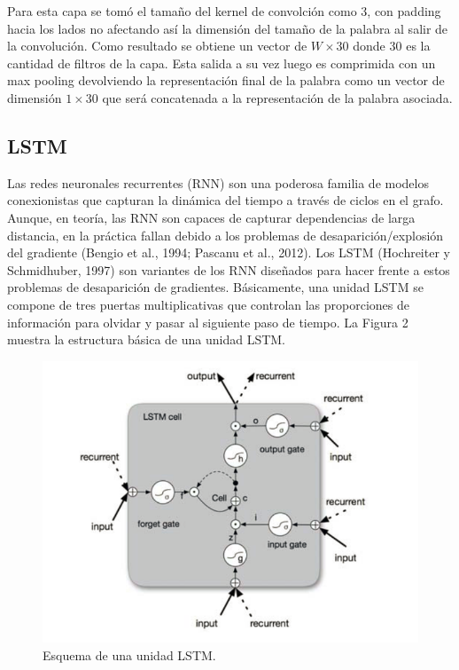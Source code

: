 \documentclass[runningheads]{llncs}
\begin{document}
\newpage

Para esta capa se tomó el tamaño del kernel de convolción como 3, con padding hacia los lados 
no afectando así la dimensión del tamaño de la palabra al salir de la convolución. Como resultado
se obtiene un vector de $W \times 30$ donde 30 es la cantidad de filtros de la capa. Esta salida a su vez
luego es comprimida con un max pooling devolviendo la representación final de la palabra como un
vector de dimensión $1 \times 30$ que será concatenada a la representación de la palabra asociada.

\subsection{LSTM}
	
Las redes neuronales recurrentes (RNN) son una poderosa familia de modelos conexionistas que capturan 
la dinámica del tiempo a través de ciclos en el grafo. Aunque, en teoría, las RNN son capaces de 
capturar dependencias de larga distancia, en la práctica fallan debido a los problemas de 
desaparición/explosión del gradiente (Bengio et al., 1994; Pascanu et al., 2012). Los LSTM 
(Hochreiter y Schmidhuber, 1997) son variantes de los RNN diseñados para hacer frente a estos 
problemas de desaparición de gradientes. Básicamente, una unidad LSTM se compone de tres puertas
multiplicativas que controlan las proporciones de información para olvidar y pasar al siguiente 
paso de tiempo. La Figura 2 muestra la estructura básica de una unidad LSTM.

\begin{figure}
	\centering
	\includegraphics[width=12cm]{Fig_2.png}
	\caption{  Esquema de una unidad LSTM.}
	\label{F2}
\end{figure}
\end{document}

